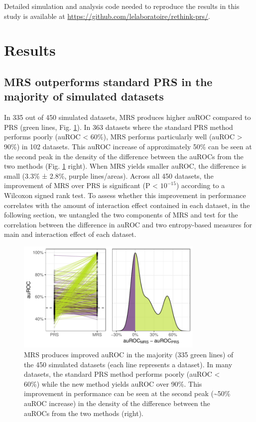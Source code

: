 \documentclass{ws-procs11x85}
\begin{document}
Detailed simulation and analysis code needed to reproduce the results in
this study is available at
\url{https://github.com/lelaboratoire/rethink-prs/}.


\section{Results}\label{results}

\subsection{MRS outperforms standard PRS in the majority of simulated
datasets}\label{mrs-outperforms-standard-prs-in-the-majority-of-simulated-datasets}

In 335 out of 450 simulated datasets, MRS produces higher auROC compared
to PRS (green lines, Fig. \ref{fig:auroc_mrs_prs}). In 363 datasets
where the standard PRS method performs poorly (auROC \textless{} 60\%),
MRS performs particularly well (auROC \textgreater{} 90\%) in 102
datasets. This auROC increase of approximately 50\% can be seen at the second peak in the density of the difference between the auROCs from the two methods (Fig. \ref{fig:auroc_mrs_prs} right).
When MRS yields smaller auROC, the difference is small (3.3\%
± 2.8\%, purple lines/areas). Across all 450 datasets, the improvement of
MRS over PRS is significant (P \textless{} \(10^{-15}\)) according to a
Wilcoxon signed rank test. To assess whether this improvement in
performance correlates with the amount of interaction effect contained
in each dataset, in the following section, we untangled the two
components of MRS and test for the correlation between the difference in
auROC and two entropy-based measures for main and interaction effect of
each dataset.

\begin{figure}
\centering
\includegraphics[width=0.8\textwidth]{images/1_ori_vs_MRS_auROC_.pdf}
\caption{MRS produces improved auROC in the majority (335 green lines)
of the 450 simulated datasets (each line represents a dataset). In many
datasets, the standard PRS method performs poorly (auROC \textless{}
60\%) while the new method yields auROC over 90\%. This improvement in
performance can be seen at the second peak (\textasciitilde{}50\% auROC
increase) in the density of the difference between the auROCs from the
two methods (right).}
\label{fig:auroc_mrs_prs}
\end{figure}
\end{document}
